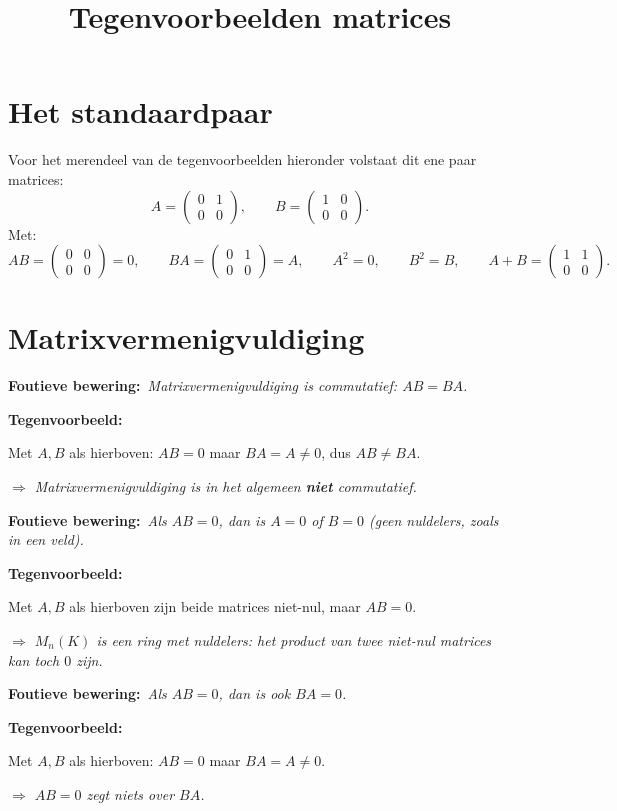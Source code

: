 \documentclass[10pt,a4paper]{article}
\title{\textbf{Tegenvoorbeelden matrices}}
\newenvironment{ce}[1]{%
  \par\noindent\textbf{Foutieve bewering:}~\textit{#1}\par\noindent\textbf{Tegenvoorbeeld:}~\ignorespaces
}{%
  \par\vspace{5pt}\normalfont
}
\newcommand{\concl}[1]{\par\noindent\textit{$\Rightarrow$ #1}}
\begin{document}
\maketitle
\section{Het standaardpaar}
Voor het merendeel van de tegenvoorbeelden hieronder volstaat dit ene paar matrices:
\[
A=\begin{pmatrix}0&1\\0&0\end{pmatrix}, \qquad B=\begin{pmatrix}1&0\\0&0\end{pmatrix}.
\]
Met:
\[
AB=\begin{pmatrix}0&0\\0&0\end{pmatrix}=0, \qquad BA=\begin{pmatrix}0&1\\0&0\end{pmatrix}=A, \qquad A^2=0, \qquad B^2=B, \qquad A+B=\begin{pmatrix}1&1\\0&0\end{pmatrix}.
\]

\section{Matrixvermenigvuldiging}

\begin{ce}{Matrixvermenigvuldiging is commutatief: $AB=BA$.}
Met $A,B$ als hierboven: $AB=0$ maar $BA=A\ne0$, dus $AB\ne BA$.
\concl{Matrixvermenigvuldiging is in het algemeen \textbf{niet} commutatief.}
\end{ce}

\begin{ce}{Als $AB=0$, dan is $A=0$ of $B=0$ (geen nuldelers, zoals in een veld).}
Met $A,B$ als hierboven zijn beide matrices niet-nul, maar $AB=0$.
\concl{$M_n(K)$ is een ring met nuldelers: het product van twee niet-nul matrices kan toch $0$ zijn.}
\end{ce}

\begin{ce}{Als $AB=0$, dan is ook $BA=0$.}
Met $A,B$ als hierboven: $AB=0$ maar $BA=A\ne0$.
\concl{$AB=0$ zegt niets over $BA$.}
\end{ce}
\end{document}
